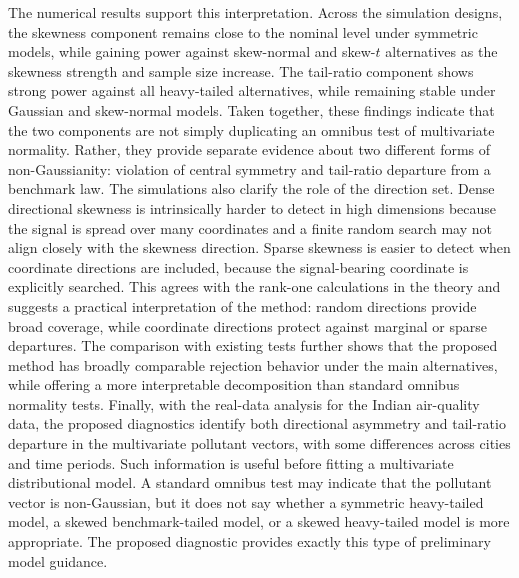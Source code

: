 \documentclass[11pt]{article}
\theoremstyle{plain}
\theoremstyle{definition}
\theoremstyle{remark}
\begin{document}
The numerical results support this interpretation. Across the simulation designs, the skewness component remains close to the nominal level under symmetric models, while gaining power against skew-normal and skew-\(t\) alternatives as the skewness strength and sample size increase. The tail-ratio component shows strong power against all heavy-tailed alternatives, while remaining stable under Gaussian and skew-normal models. Taken together, these findings indicate that the two components are not simply duplicating an omnibus test of multivariate normality. Rather, they provide separate evidence about two different forms of non-Gaussianity: violation of central symmetry and tail-ratio departure from a benchmark law. The simulations also clarify the role of the direction set. Dense directional skewness is intrinsically harder to detect in high dimensions because the signal is spread over many coordinates and a finite random search may not align closely with the skewness direction. Sparse skewness is easier to detect when coordinate directions are included, because the signal-bearing coordinate is explicitly searched. This agrees with the rank-one calculations in the theory and suggests a practical interpretation of the method: random directions provide broad coverage, while coordinate directions protect against marginal or sparse departures. The comparison with existing tests further shows that the proposed method has broadly comparable rejection behavior under the main alternatives, while offering a more interpretable decomposition than standard omnibus normality tests. Finally, with the real-data analysis for the Indian air-quality data, the proposed diagnostics identify both directional asymmetry and tail-ratio departure in the multivariate pollutant vectors, with some differences across cities and time periods. Such information is useful before fitting a multivariate distributional model. A standard omnibus test may indicate that the pollutant vector is non-Gaussian, but it does not say whether a symmetric heavy-tailed model, a skewed benchmark-tailed model, or a skewed heavy-tailed model is more appropriate. The proposed diagnostic provides exactly this type of preliminary model guidance.
\end{document}
